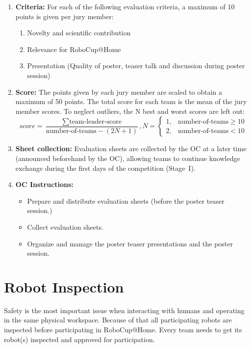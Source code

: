 \begin{enumerate}
	\item \textbf{Criteria:} For each of the following evaluation criteria, a maximum of 10 points is given per jury member:
	\begin{enumerate}
		\item Novelty and scientific contribution
		\item Relevance for RoboCup@Home
		\item Presentation (Quality of poster, teaser talk and discussion during poster session)
	\end{enumerate}
	\item \textbf{Score:} The points given by each jury member are scaled to obtain a maximum of 50 points. The total score for each team is the mean of the jury member scores. To neglect outliers, the N best and worst scores are left out:
	$$
	score=\frac{\sum \text{team-leader-score}}{\text{number-of-teams}-\left ( 2N+1  \right )},N=\left\{\begin{matrix}
	1, & \text{number-of-teams} \geq 10\\
	2, & \text{number-of-teams} < 10
	\end{matrix}\right.
	$$
	\item \textbf{Sheet collection:} Evaluation sheets are collected by the OC at a later time (announced beforehand by the OC), allowing teams to continue knowledge exchange during the first days of the competition (Stage~I).
	\item \textbf{OC Instructions:}
	\begin{itemize}
		\item Prepare and distribute evaluation sheets (before the poster teaser session.)
		\item Collect evaluation sheets.
		\item Organize and manage the poster teaser presentations and the poster session.
	\end{itemize}
\end{enumerate}

\section{Robot Inspection}
\label{sec:robot_inspection}
Safety is the most important issue when interacting with humans and operating in the same physical workspace. Because of that all participating robots are inspected before participating in RoboCup@Home. Every team needs to get its robot(s) inspected and approved for participation.

